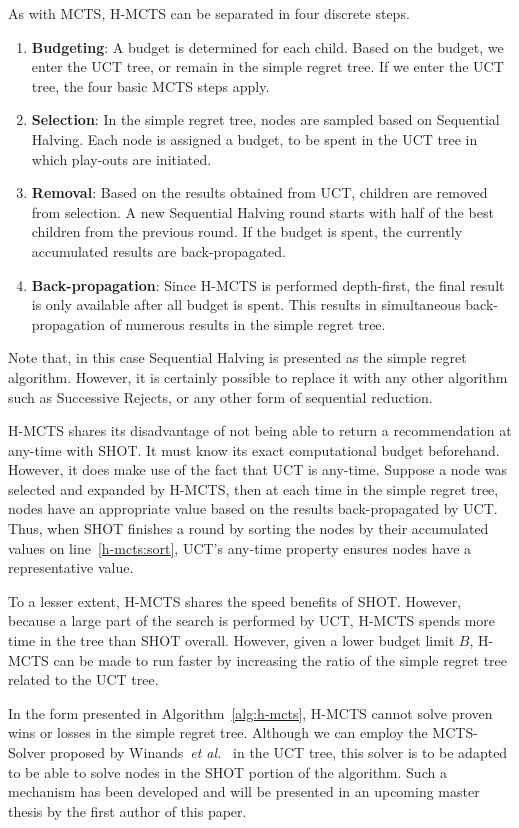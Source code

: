 \documentclass[a4paper]{llncs}
\begin{document}
As with MCTS, H-MCTS can be separated in four discrete steps.
\begin{enumerate}
\item \textbf{Budgeting}: A budget is determined for each child. Based on the budget, we enter the UCT tree, or remain in the simple regret tree. If we enter the UCT tree, the four basic MCTS steps apply.
\item \textbf{Selection}: In the simple regret tree, nodes are sampled based on Sequential Halving. Each node is assigned a budget, to be spent in the UCT tree in which play-outs are initiated.
\item \textbf{Removal}: Based on the results obtained from UCT, children are removed from selection. A new Sequential Halving round starts with half of the best children from the previous round. If the budget is spent, the currently accumulated results are back-propagated.
\item \textbf{Back-propagation}: Since H-MCTS is performed depth-first, the final result is only available after all budget is spent. This results in simultaneous back-propagation of numerous results in the simple regret tree.
\end{enumerate}
Note that, in this case Sequential Halving is presented as the simple regret algorithm. However, it is certainly possible to replace it with any other algorithm such as Successive Rejects, or any other form of sequential reduction.

H-MCTS shares its disadvantage of not being able to return a recommendation at any-time with SHOT. It must know its exact computational budget beforehand. However, it does make use of the fact that UCT is any-time. Suppose a node was selected and expanded by H-MCTS, then at each time in the simple regret tree, nodes have an appropriate value based on the results back-propagated by UCT. Thus, when SHOT finishes a round by sorting the nodes by their accumulated values on line~\ref{h-mcts:sort}, UCT's any-time property ensures nodes have a representative value.

To a lesser extent, H-MCTS shares the speed benefits of SHOT. However, because a large part of the search is performed by UCT, H-MCTS spends more time in the tree than SHOT overall. However, given a lower budget limit $B$, H-MCTS can be made to run faster by increasing the ratio of the simple regret tree related to the UCT tree.

In the form presented in Algorithm~\ref{alg:h-mcts}, H-MCTS cannot solve proven wins or losses in the simple regret tree. Although we can employ the MCTS-Solver proposed by Winands~\emph{et al.}~\cite{Winands2008} in the UCT tree, this solver is to be adapted to be able to solve nodes in the SHOT portion of the algorithm. Such a mechanism has been developed and will be presented in an upcoming master thesis by the first author of this paper.
\end{document}
